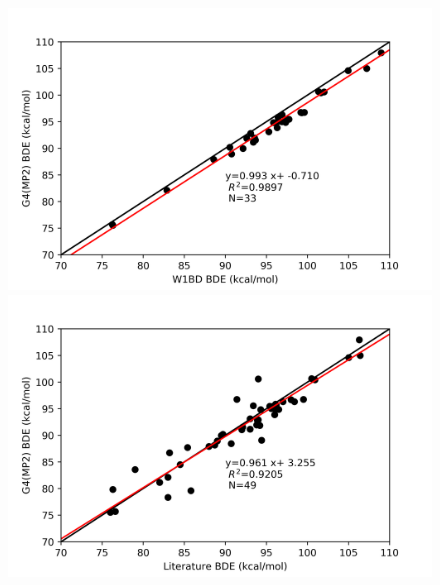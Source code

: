 \begin{figure}
\centering
\begin{minipage}{8cm}
  \centering
  \includegraphics[width=\textwidth]{figures/w1bd-g4mp2}
\end{minipage}%
\begin{minipage}{8cm}
  \centering
  \includegraphics[width=\textwidth]{figures/lit-g4mp2}
\end{minipage}
\end{figure}


